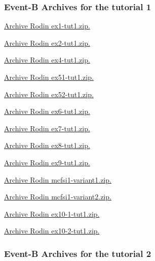 \documentclass[ 12pt]{article}
\begin{document}
 \subsubsection{Event-B Archives for   the tutorial 1}
\label{sec:event-b-archives}



\href{http://mery54.github.io/teaching/mosos/models/ex1-tut1.zip}{Archive
  Rodin   ex1-tut1.zip.}

\href{http://mery54.github.io/teaching/mosos/models/ex2-tut1.zip}{Archive 
  Rodin   ex2-tut1.zip.}

\href{http://mery54.github.io/teaching/mosos/models/ex4-tut1.zip}{Archive 
  Rodin   ex4-tut1.zip.}


\href{http://mery54.github.io/teaching/mosos/models/ex51-tut1.zip}{Archive 
  Rodin   ex51-tut1.zip.}

\href{http://mery54.github.io/teaching/mosos/models/ex52-tut1.zip}{Archive 
  Rodin   ex52-tut1.zip.}



\href{http://mery54.github.io/teaching/mosos/models/ex6-tut1.zip}{Archive 
  Rodin   ex6-tut1.zip.}



\href{http://mery54.github.io/teaching/mosos/models/ex7-tut1.zip}{Archive 
  Rodin   ex7-tut1.zip.}


\href{http://mery54.github.io/teaching/mosos/models/ex8-tut1.zip}{Archive 
  Rodin   ex8-tut1.zip.}


\href{http://mery54.github.io/teaching/mosos/models/ex9-tut1.zip}{Archive 
  Rodin   ex9-tut1.zip.}



\href{http://mery54.github.io/teaching/mosos/models/mcfsi1-variant1.zip}{Archive 
  Rodin   mcfsi1-variant1.zip.}

\href{http://mery54.github.io/teaching/mosos/models/mcfsi1-variant2.zip}{Archive 
  Rodin   mcfsi1-variant2.zip.}


\href{http://mery54.github.io/teaching/mosos/models/ex10-1-tut1.zip}{Archive 
  Rodin   ex10-1-tut1.zip.}

\href{http://mery54.github.io/teaching/mosos/models/ex10-2-tut1.zip}{Archive 
  Rodin   ex10-2-tut1.zip.}



 \subsubsection{Event-B Archives for   the tutorial 2}
\label{sec:event-b-archives}
\end{document}

